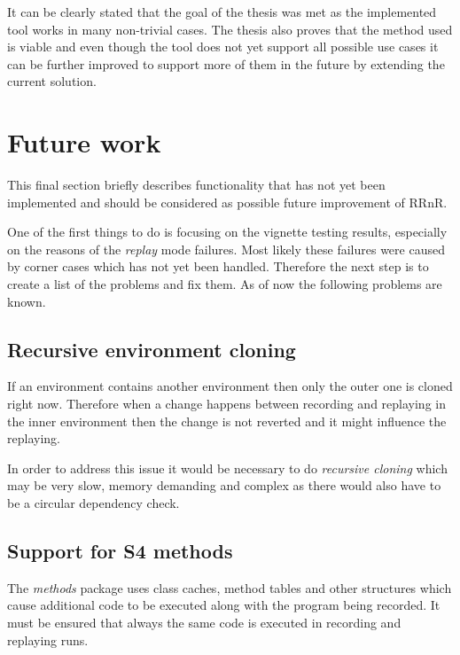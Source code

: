 \documentclass[thesis=M,english,hidelinks]{FITthesis}[2012/10/20]
\begin{document}
It can be clearly stated that the goal of the thesis was met as the implemented tool works in many non-trivial cases. The thesis also proves that the method used is viable and even though the tool does not yet support all possible use cases it can be further improved to support more of them in the future by extending the current solution.\par

	\section{Future work}
	This final section briefly describes functionality that has not yet been implemented and should be considered as possible future improvement of RRnR.\par
	
	One of the first things to do is focusing on the vignette testing results, especially on the reasons of the \emph{replay} mode failures. Most likely these failures were caused by corner cases which has not yet been handled. Therefore the next step is to create a list of the problems and fix them. As of now the following problems are known.\par
	
		\subsection{Recursive environment cloning}
		If an environment contains another environment then only the outer one is cloned right now. Therefore when a change happens between recording and replaying in the inner environment then the change is not reverted and it might influence the replaying.\par
		
		In order to address this issue it would be necessary to do \emph{recursive cloning} which may be very slow, memory demanding and complex as there would also have to be a circular dependency check.\par
		
		\subsection{Support for S4 methods}
		The \emph{methods} package uses class caches, method tables and other structures which cause additional code to be executed along with the program being recorded. It must be ensured that always the same code is executed in recording and replaying runs.\par
		
\end{document}
